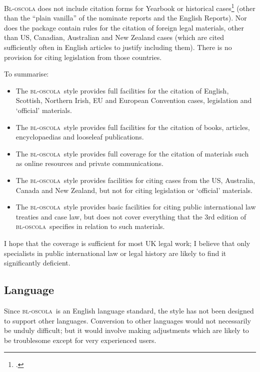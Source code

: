 \documentclass[a5paper,fontsize=9pt,DIV=1]{scrartcl}
\newcommand{\oscola}{\textsc{bl-oscola}}
\begin{document}
\textsc{Bl-oscola}
does not include citation forms for Yearbook or historical
cases\footcite[20--21]{oscola} (other than the \enquote{plain vanilla}
of the nominate reports and the English Reports). Nor does the package
contain rules for the citation of foreign legal materials, other than US,
Canadian, Australian and New Zealand cases (which are cited
sufficiently often in English articles to justify including
them). There is no provision for citing legislation from those
countries.

To summarise:
\begin{itemize}
\item The \oscola\ style provides full facilities for the citation of
  English, Scottish, Northern Irish, EU and European Convention cases,
  legislation and `official' materials.
\item The \oscola\ style provides full facilities for the citation
  of books, articles, encyclopaedias and looseleaf publications.
\item The \oscola\ style provides full coverage for the citation of
  materials such as online resources and private communications.
\item The \oscola\ style provides facilities for citing cases from
  the US, Australia, Canada and New Zealand, but not for citing
  legislation or `official' materials.
\item The \oscola\ style provides basic facilities for citing public
  international law treaties and case law, but does not cover
  everything that the 3rd edition of \oscola\ specifies in relation to
  such materials.
\end{itemize}
I hope that the coverage is sufficient for most UK legal work; I believe
that only specialists in public international law or legal history are
likely to find it significantly deficient.

\subsection{Language}

Since \oscola\ is an English language
standard, the style has not been designed to support other
languages. Conversion to other languages would not necessarily be
unduly difficult; but it would involve making adjustments which are
likely to be troublesome except for very experienced users.
\end{document}
